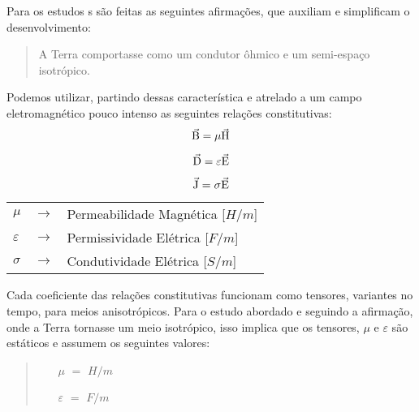         Para os estudos \mt s são feitas as seguintes afirmações, que auxiliam e simplificam o desenvolvimento:
       
        \begin{quote}
            A Terra comportasse como um condutor ôhmico e um semi-espaço isotrópico.
        \end{quote}
        
        Podemos utilizar, partindo dessas característica e atrelado a um campo eletromagnético pouco intenso as seguintes relações constitutivas:
        \begin{equation}
         \vec{\textrm{B}} = \mu \vec{\textrm{H}}
        \end{equation}
        
        \begin{equation}
         \vec{\textrm{D}} = \varepsilon \vec{\textrm{E}}
        \end{equation}
        
        \begin{equation}
         \vec{\textrm{J}} = \sigma \vec{\textrm{E}}
        \end{equation}

        {\footnotesize \noindent
            \begin{table}[H]
                \begin{tabular*}{1cm}{p{0.05cm}p{0.1cm}p{10cm}}
                    {\footnotesize $\mu$}          & {\footnotesize $\rightarrow$} & {\footnotesize Permeabilidade Magnética [$H/m$] }\\
                    {\footnotesize $\varepsilon$}  & {\footnotesize $\rightarrow$} & {\footnotesize Permissividade Elétrica [$F/m$] }\\
                    {\footnotesize $\sigma$}       & {\footnotesize $\rightarrow$} & {\footnotesize Condutividade Elétrica [$S/m$]} \\
                \end{tabular*}
            \end{table}}

        \noindent Cada coeficiente das relações constitutivas funcionam como tensores, variantes no tempo, para meios anisotrópicos. Para o estudo abordado e seguindo a afirmação, onde a Terra tornasse um meio isotrópico, isso implica que os tensores, $\mu$ e $\varepsilon$ são estáticos e assumem os seguintes valores:
        
        \begin{quote}
            \begin{enumerate}
                \item[$\mu$] $=$ $H/m$
                \item[$\varepsilon$] $=$ $F/m$
            \end{enumerate}
        \end{quote}
        
